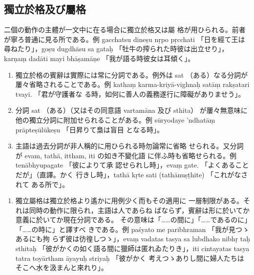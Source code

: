 \subsection{獨立於格及び屬格}
\numberParagraph \label{np:231}
二個の動作の主體が一文中に在る場合に獨立於格又は屬
格が用ひられる。前者が寧ろ普通に見る所である。例 gacchatsu
dineṣu nṛpo pṛcchati 「日を經て王は尋ねたり」，goṣu dugdhāsu
sa gataḥ 「牡牛の搾られた時彼は出立せり」，karṇaṃ dadāti
mayi bhāṣamāṇe 「我が語る時彼女は耳傾く」。
\begin{enumerate}[label=(\alph*)]
\item 獨立於格の賓辭は實際には常に分詞である。例外は sat
（ある）なる分詞が屢々省略されることである。例 kathaṃ
karma-kriyā-vighnaḥ satāṃ rakṣatari tvayi. 「君が守護者な
る時，如何に善人の義務遂行に障礙がありませう」。
\item 分詞 sat （ある）（又はその同意語 vartamāna 及び sthita）
が屢々無意味に他の獨立分詞に附加せられることがある。例
sūryodaye 'ndhatāṃ prāpteṣūlūkeṣu 「日昇りて梟は盲目
となる時」。
\item 主語は過去分詞が非人稱的に用ひられる時勿論常に省略
せられる。又分詞が evam, tathā, ittham, iti の如き不變化語
に伴ふ時も省略せられる。例 tenābhyupagate 「彼によりて承
認せられし時」，evaṃ gate. 「よくあることだが」（直譯。かく
行きし時」，tathā kṛte sati (tathānuṣṭhite) 「これがなされて
ある所で」。
\end{enumerate}
\begin{enumerate}[label=(\arabic*), start=2]
\item 獨立屬格は獨立於格より遙かに用例少く而もその適用に
一層制限がある。それは同時の動作に限られ，主語は人であらね
ばならず，賓辭は形に於いてか意義に於いてか現在分詞である。
その意味は「……の間に」「……であるのに」「……の時に」と譯すべ
きである。例 paśyato me paribhraman 「我が見つゝあるにも拘
らず彼は彷徨しつゝ」，evaṃ vadatas tasya sa lubdhako nibhṛ\-%
taḥ sthitaḥ 「彼がかくの如く語る間に獵師は匿れゐたりき」，iti
cintayatas tasya tatra toyārtham āyayuḥ striyaḥ 「彼がかく
考えつゝありし間に婦人たちはそこへ水を汲まんと來れり」。
\end{enumerate}

